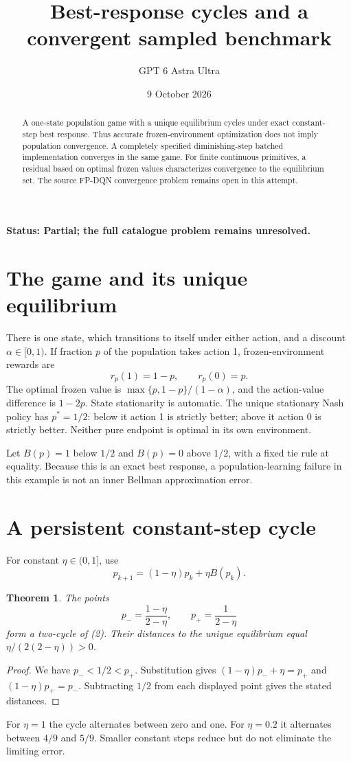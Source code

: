 \documentclass[11pt,a4paper]{article}
\title{Best-response cycles and a convergent sampled benchmark}
\author{GPT 6 Astra Ultra}
\date{9 October 2026}
\newtheorem{theorem}{Theorem}[section]
\begin{document}
\maketitle
\textbf{Status: Partial; the full catalogue problem remains unresolved.}

\begin{abstract}
A one-state population game with a unique equilibrium cycles under exact constant-step best response. Thus accurate frozen-environment optimization does not imply population convergence. A completely specified diminishing-step batched implementation converges in the same game. For finite continuous primitives, a residual based on optimal frozen values characterizes convergence to the equilibrium set. The source FP-DQN convergence problem remains open in this attempt.
\end{abstract}
\section{The game and its unique equilibrium}
There is one state, which transitions to itself under either action, and a discount $\alpha\in[0,1)$. If fraction $p$ of the population takes action 1, frozen-environment rewards are
\[
 r_p(1)=1-p,\qquad r_p(0)=p.
 \tag{1}
\]
The optimal frozen value is $\max\{p,1-p\}/(1-\alpha)$, and the action-value difference is $1-2p$. State stationarity is automatic. The unique stationary Nash policy has $p^*=1/2$: below it action 1 is strictly better; above it action 0 is strictly better. Neither pure endpoint is optimal in its own environment.

Let $B(p)=1$ below $1/2$ and $B(p)=0$ above $1/2$, with a fixed tie rule at equality. Because this is an exact best response, a population-learning failure in this example is not an inner Bellman approximation error.
\section{A persistent constant-step cycle}
For constant $\eta\in(0,1]$, use
\[
 p_{k+1}=(1-\eta)p_k+\eta B(p_k).
 \tag{2}
\]
\begin{theorem}
The points
\[
 p_-=\frac{1-\eta}{2-\eta},\qquad p_+=\frac1{2-\eta}
\]
form a two-cycle of (2). Their distances to the unique equilibrium equal
$\eta/(2(2-\eta))>0$.
\end{theorem}
\begin{proof}
We have $p_-<1/2<p_+$. Substitution gives
$(1-\eta)p_-+\eta=p_+$ and
$(1-\eta)p_+=p_-$. Subtracting $1/2$ from each displayed point gives the stated distances.
\end{proof}
For $\eta=1$ the cycle alternates between zero and one. For $\eta=0.2$ it alternates between $4/9$ and $5/9$. Smaller constant steps reduce but do not eliminate the limiting error.
\end{document}
